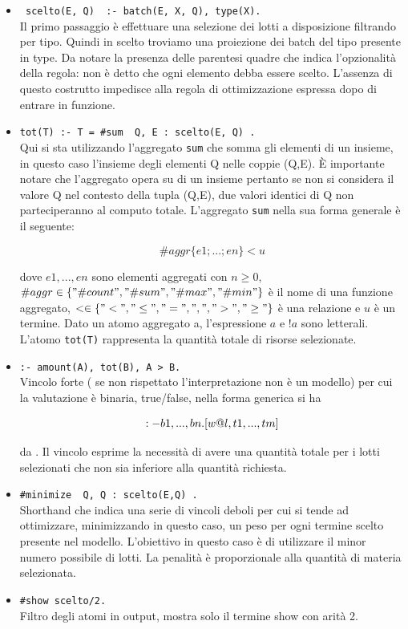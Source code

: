 \documentclass[a4paper,11pt]{article}
\begin{document}
\begin{itemize}
  \item \texttt{{ scelto(E, Q) } :- batch(E, X, Q), type(X).} \\
        Il primo passaggio è effettuare una selezione dei lotti a disposizione filtrando per tipo. Quindi in scelto troviamo una proiezione dei batch del tipo presente in type. Da notare la presenza delle parentesi quadre che indica l'opzionalità della regola: non è detto che ogni elemento debba essere scelto. L'assenza di questo costrutto impedisce alla regola di ottimizzazione espressa dopo di entrare in funzione.


  \item \texttt{tot(T) :- T = \#sum { Q, E : scelto(E, Q) }.} \\

        Qui si sta utilizzando l'aggregato \texttt{sum} che somma gli elementi di un insieme, in questo caso l'insieme degli elementi Q nelle coppie (Q,E). È importante notare che l'aggregato opera su di un insieme pertanto se non si considera il valore Q nel contesto della tupla (Q,E), due valori identici di Q non parteciperanno al computo totale.
        L'aggregato \texttt{sum} nella sua forma generale è il seguente:

        $$ \#aggr\{e1;...;en\} < u $$

        dove $e1,...,en$ sono elementi aggregati con $n \geq 0$, \\ $\#aggr \in \{"\#count", "\#sum", "\#max", "\#min"\}$ è il nome di una funzione aggregato,  $ < \in \{"<", "\leq", "=", ",", ">", "\geq"\}$ è una relazione e $u$ è un termine. Dato un atomo aggregato a, l'espressione $a$ e $!a$ sono letterali.\cite{CALIMERI_2019}
        L'atomo \texttt{tot(T)} rappresenta la quantità totale di risorse selezionate.

  \item \texttt{:- amount(A), tot(B), A > B.}  \\
        Vincolo forte ( se non rispettato l'interpretazione non è un modello) per cui la valutazione è binaria, true/false, nella forma generica si ha

        $$ :- \space b1,...,bn. [w@l,t1,...,tm] $$

        da \cite{CALIMERI_2019}.
        Il vincolo esprime la necessità di avere una quantità totale per i lotti selezionati che non sia inferiore alla quantità richiesta.

  \item \texttt{\#minimize { Q, Q : scelto(E,Q) }.} \\
        Shorthand che indica una serie di vincoli deboli \cite{CALIMERI_2019} per cui si tende ad ottimizzare, minimizzando in questo caso, un peso per ogni termine scelto presente nel modello. L'obiettivo in questo caso è di utilizzare il minor numero possibile di lotti.
        La penalità è proporzionale alla quantità di materia selezionata.

  \item \texttt{\#show scelto/2.} \\
        Filtro degli atomi in output, mostra solo il termine show con arità 2.
\end{itemize}
\end{document}
